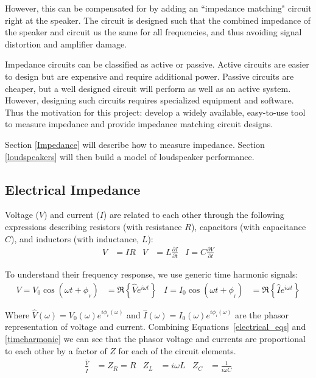 \documentclass[10pt,letterpaper]{book}
\begin{document}
However, this can be compensated for by adding an ``impedance matching" circuit right at the speaker. The circuit is designed such that the combined impedance of the speaker and circuit us the same for all frequencies, and thus avoiding signal distortion and amplifier damage.

Impedance circuits can be classified as active or passive. Active circuits are easier to design but are expensive and require additional power. Passive circuits are cheaper, but a well designed circuit will perform as well as an active system. However, designing such circuits requires specialized equipment and software. Thus the motivation for this project: develop a widely available, easy-to-use tool to measure impedance and provide impedance matching circuit designs.

Section \ref{Impedance} will describe how to measure impedance. Section \ref{loudspeakers} will then build a model of loudspeaker performance.
\subsection{Electrical Impedance}
Voltage ($V$) and current ($I$) are related to each other through the following expressions describing resistors (with resistance $R$), capacitors (with capacitance $C$), and inductors (with inductance, $L$):
\begin{align}\label{electrical_eqs}
V&=IR & V&=L\frac{\partial I}{\partial t} & I=C\frac{\partial V}{\partial t}
\end{align}

To understand their frequency response, we use generic time harmonic signals:
\begin{align}\label{timeharmonic}
V=V_0\cos(\omega t + \phi_{_V})&=\Re{ \left\{ \hat{V}e^{i\omega t}\right\} } &
I=I_0\cos(\omega t + \phi_{_I})&=\Re{ \left\{ \hat{I}e^{i\omega t}\right\} }
\end{align}

Where $\hat{V}(\omega)=V_0(\omega)e^{i\phi_{_V}(\omega)}$ and $\hat{I}(\omega)=I_0(\omega)e^{i\phi_{_I}(\omega)}$ are the phasor representation of voltage and current. Combining Equations~\ref{electrical_eqs} and \ref{timeharmonic} we can see that the phasor voltage and currents are proportional to each other by a factor of $Z$ for each of the circuit elements.
\begin{align}
\frac{\hat{V}}{\hat{I}}&=Z_R=R & Z_L&=i\omega L & Z_C&=\frac{1}{i\omega C}
\end{align}
\end{document}
